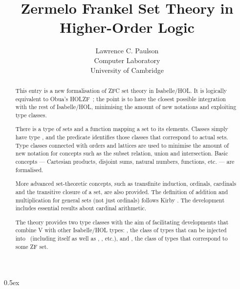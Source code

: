 \documentclass[11pt,a4paper]{article}
\begin{document}
\title{Zermelo Frankel Set Theory in Higher-Order Logic}
\author{Lawrence C. Paulson\\ Computer Laboratory\\ University of Cambridge}

\maketitle

\begin{abstract}
This entry is a new formalisation of ZFC set theory in Isabelle/HOL\@.
It is logically equivalent to Obua's HOLZF~\cite{obua-partizan-games}; the point is to have the closest possible integration
with the rest of Isabelle/HOL, minimising the amount of new notations and exploiting type classes.

There is a type  of sets and a function 
 mapping a set to its elements.
Classes simply have type , and the predicate  identifies those classes that correspond to actual sets.
Type classes connected with orders and lattices are used to minimise the amount of new notation
for concepts such as the subset relation, union and intersection.
Basic concepts --- Cartesian products, disjoint sums, natural numbers, functions, etc. --- are formalised.

More advanced set-theoretic concepts, such as transfinite induction, ordinals, cardinals
and the transitive closure of a set, are also provided.
The definition of addition and multiplication for general sets (not just ordinals) follows Kirby \cite{kirby-addition}.
The development includes essential results about cardinal arithmetic.

The theory provides two type classes with the aim of
facilitating developments that combine V with other Isabelle/HOL types:
, the class of types that can be injected into~ (including  itself as well as , , etc.), and
, the class of types that correspond to some ZF set.
\end{abstract}

\newpage
\tableofcontents

\parindent 0pt\parskip 0.5ex

\newpage




\end{document}
